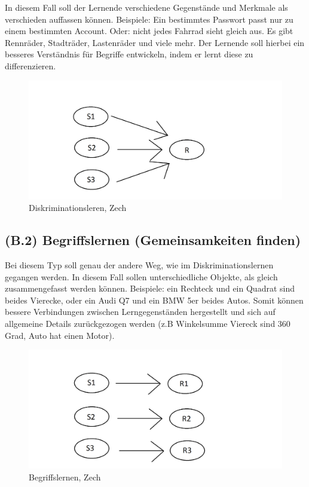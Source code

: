 In diesem Fall soll der Lernende verschiedene Gegenstände und Merkmale als verschieden auffassen können. Beispiele: Ein bestimmtes Passwort passt nur zu einem bestimmten Account. Oder: nicht jedes Fahrrad sieht gleich aus. Es gibt Rennräder, Stadträder, Lastenräder und viele mehr. Der Lernende soll hierbei ein besseres Verständnis für Begriffe entwickeln, indem er lernt diese zu differenzieren.

\begin{figure}[!ht]
\noindent\hspace{0.5mm}\includegraphics[width=12cm]{./Ressourcen/Diskrimination.png}
\caption{Diskriminationsleren, Zech}
\end{figure}

\subsection[]{(B.2) Begriffslernen (Gemeinsamkeiten finden)}

Bei diesem Typ soll genau der andere Weg, wie im Diskriminationslernen gegangen werden. In diesem Fall sollen unterschiedliche Objekte, als gleich zusammengefasst werden können. 
Beispiele: ein Rechteck und ein Quadrat sind beides Vierecke, oder ein Audi Q7 und ein BMW 5er beides Autos. Somit können bessere Verbindungen zwischen Lerngegenständen hergestellt und sich auf allgemeine Details zurückgezogen werden (z.B Winkelsumme Viereck sind 360 Grad, Auto hat einen Motor).

\begin{figure}[!ht]
\noindent\hspace{0.5mm}\includegraphics[width=12cm]{./Ressourcen/Begriffslernen.png}
\caption{Begriffslernen, Zech}
\end{figure}


